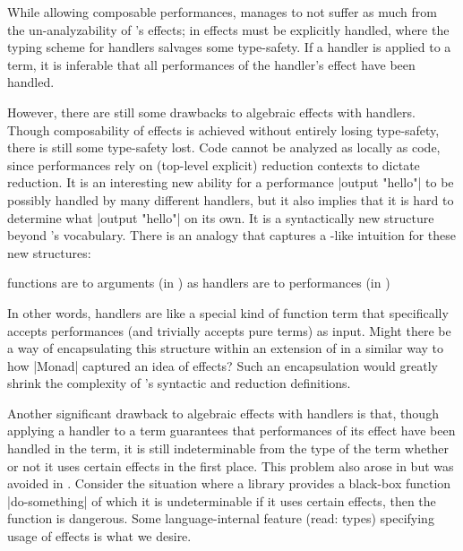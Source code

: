 While allowing composable performances, \LangD manages to not suffer as much from the un-analyzability of \LangB's effects;
in \LangD effects must be explicitly handled, where the typing scheme for handlers salvages some type-safety.
If a handler is applied to a term, it is inferable that all performances of the handler's effect have been handled.



However, there are still some drawbacks to algebraic effects with handlers.
Though composability of effects is achieved without entirely losing type-safety, there is still some type-safety lost.
Code cannot be analyzed as locally as \LangC code, since performances rely on (top-level explicit) reduction contexts to dictate reduction.
It is an interesting new ability for a performance \code|output "hello"| to be possibly handled by many different handlers, but it also implies that it is hard to determine what \code|output "hello"|  on its own.
It is a syntactically new structure beyond \LangA's vocabulary.
There is an analogy that captures a \LangA-like intuition for these new structures:
\begin{display}
  functions are to arguments (in \LangA) as
  handlers are to performances (in \LangD)
\end{display}
In other words, handlers are like a special kind of function term that specifically accepts performances (and trivially accepts pure terms) as input.
Might there be a way of encapsulating this structure within an extension of \LangA in a similar way to how \code|Monad| captured an idea of effects?
Such an encapsulation would greatly shrink the complexity of \LangD's syntactic and reduction definitions.

Another significant drawback to algebraic effects with handlers is that, though applying a handler to a term guarantees that performances of its effect have been handled in the term, it is still indeterminable from the type of the term whether or not it uses certain effects in the first place.
This problem also arose in \LangB but was avoided in \LangC.
Consider the situation where a library provides a black-box function \code|do-something| of which it is undeterminable if it uses certain effects, then the function is dangerous.
Some language-internal feature (read: types) specifying usage of effects is what we desire.
